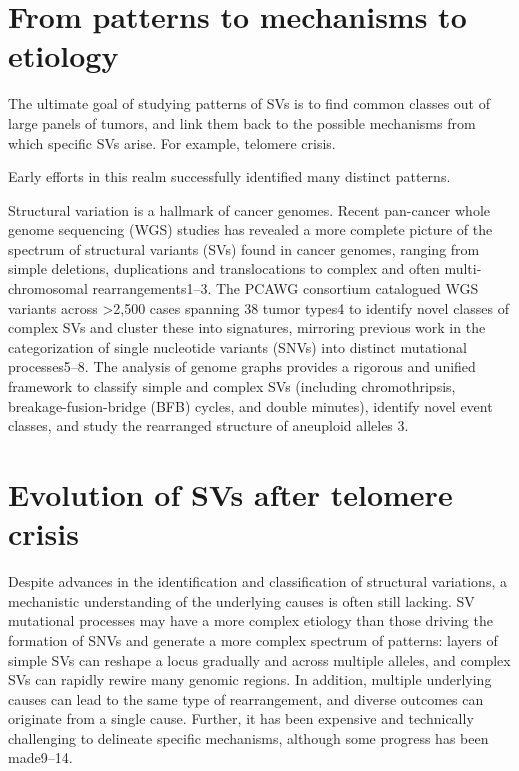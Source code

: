 \documentclass[phd,tocprelim]{cornell}
\begin{document}
\section{From patterns to mechanisms to etiology}
The ultimate goal of studying patterns of SVs is to find common classes out of large panels of tumors, and link them back to the possible mechanisms from which specific SVs arise. For example, telomere crisis.

Early efforts in this realm successfully identified many distinct patterns.

Structural variation is a hallmark of cancer genomes. Recent pan-cancer whole genome sequencing (WGS) studies has revealed a more complete picture of the spectrum of structural variants (SVs) found in cancer genomes, ranging from simple deletions, duplications and translocations to complex and often multi-chromosomal rearrangements1–3. The PCAWG consortium catalogued WGS variants across >2,500 cases spanning 38 tumor types4 to identify novel classes of complex SVs and cluster these into signatures, mirroring previous work in the categorization of single nucleotide variants (SNVs) into distinct mutational processes5–8. The analysis of genome graphs provides a rigorous and unified framework to classify simple and complex SVs (including chromothripsis, breakage-fusion-bridge (BFB) cycles, and double minutes), identify novel event classes, and study the rearranged structure of aneuploid alleles 3.

\section{Evolution of SVs after telomere crisis}
Despite advances in the identification and classification of structural variations, a mechanistic understanding of the underlying causes is often still lacking. SV mutational processes may have a more complex etiology than those driving the formation of SNVs and generate a more complex spectrum of patterns: layers of simple SVs can reshape a locus gradually and across multiple alleles, and complex SVs can rapidly rewire many genomic regions. In addition, multiple underlying causes can lead to the same type of rearrangement, and diverse outcomes can originate from a single cause. Further, it has been expensive and technically challenging to delineate specific mechanisms, although some progress has been made9–14.
\end{document}
